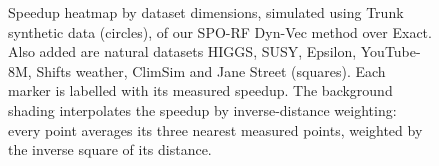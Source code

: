 \begin{figure}[t]
    \centering
    
    \caption{Speedup heatmap by dataset dimensions, simulated using Trunk synthetic data (circles), of our SPO-RF Dyn-Vec method over Exact. Also added are natural datasets HIGGS, SUSY, Epsilon, YouTube-8M, Shifts weather, ClimSim and Jane Street (squares). Each marker is labelled
    with its measured speedup. The background shading interpolates the speedup by
    inverse-distance weighting: every point averages its three nearest measured points, weighted by the inverse square
    of its distance.}
    \label{fig:speedup-heatmap}
\end{figure}

